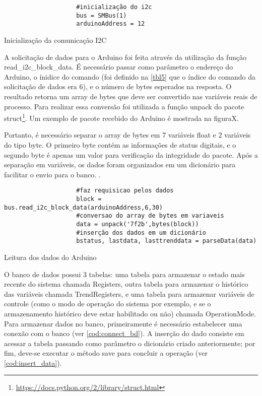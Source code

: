 				\begin{listing}[!htb]
					\begin{verbatim}
					#inicialização do i2c
					bus = SMBus(1)
					arduinoAddress = 12				
					\end{verbatim}
					\caption{Inicialização da comunicação I2C}
					\label{cod:starti2c}
				\end{listing}
				
				A solicitação de dados para o Arduino foi feita através da utilização da função read\_i2c\_block\_data. É necessário passar como parâmetro o endereço do Arduino, o ínidice do comando (foi definido na \autoref{tbl5} que o índice do comando da solicitação de dados era 6), e o número de bytes esperados na resposta. O resultado retorna um array de bytes que deve ser convertido nas variáveis reais de processo. Para realizar essa conversão foi utilizada a função unpack do pacote struct\footnote{\url{https://docs.python.org/2/library/struct.html}}. Um exemplo de pacote recebido do Arduino é mostrada na figuraX.
				
				Portanto, é necessário separar o array de bytes em 7 variáveis float e 2 variáveis do tipo byte. O primeiro byte contém as informações de status digitais, e o segundo byte é apenas um valor para verificação da integridade do pacote. Após a separação em variáveis, os dados foram organizados em um dicionário para facilitar o envio para o banco. \cite{mark2013}.
				
				\begin{listing}[!htb]
					\begin{verbatim}
					#faz requisicao pelos dados
					block = bus.read_i2c_block_data(arduinoAddress,6,30)
					#conversao do array de bytes em variaveis
					data = unpack('7f2b',bytes(block))
					#inserção dos dados em um dicionário
					bstatus, lastdata, lasttrenddata = parseData(data)			
					\end{verbatim}
					\caption{Leitura dos dados do Arduino}
					\label{cod:read_arduino}
				\end{listing}
			
				O banco de dados possui 3 tabelas: uma tabela para armazenar o estado mais recente do sistema chamada Registers, outra tabela para armazenar o histórico das variáveis chamada TrendRegisters, e uma tabela para armazenar variáveis de controle (como o modo de operação do sistema por exemplo, e se o armazenamento histórico deve estar habilitado ou não) chamada OperationMode. Para armazenar dados no banco, primeiramente é necessário estabelecer uma conexão com o banco (ver \autoref{cod:connect_bd}). A inserção do dado consiste em acessar a tabela passando como parâmetro o dicionário criado anteriormente; por fim, deve-se executar o método save para concluir a operação (ver \autoref{cod:insert_data}).
				
